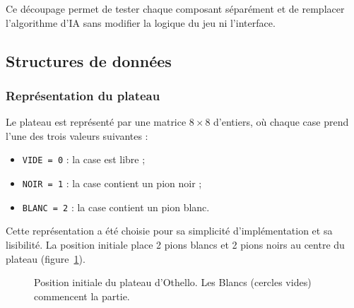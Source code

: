 \documentclass[12pt, a4paper]{article}
\begin{document}
Ce découpage permet de tester chaque composant séparément et de remplacer l'algorithme d'IA sans modifier la logique du jeu ni l'interface.


\subsection{Structures de données}

\subsubsection{Représentation du plateau}

Le plateau est représenté par une matrice $8 \times 8$ d'entiers, où chaque case prend l'une des trois valeurs suivantes :

\begin{itemize}
    \item \texttt{VIDE = 0} : la case est libre ;
    \item \texttt{NOIR = 1} : la case contient un pion noir ;
    \item \texttt{BLANC = 2} : la case contient un pion blanc.
\end{itemize}

Cette représentation a été choisie pour sa simplicité d'implémentation et sa lisibilité. La position initiale place 2 pions blancs et 2 pions noirs au centre du plateau (figure~\ref{fig:position_initiale}).

\begin{figure}[H]
    \centering
    \caption{Position initiale du plateau d'Othello. Les Blancs (cercles vides) commencent la partie.}
    \label{fig:position_initiale}
\end{figure}
\end{document}
